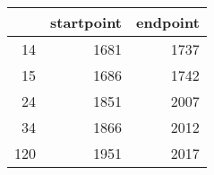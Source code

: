 % 
\begin{tabular}{rrr}
  \hline
 & startpoint & endpoint \\ 
  \hline
14 & 1681 & 1737 \\ 
  15 & 1686 & 1742 \\ 
  24 & 1851 & 2007 \\ 
  34 & 1866 & 2012 \\ 
  120 & 1951 & 2017 \\ 
   \hline
\end{tabular}
